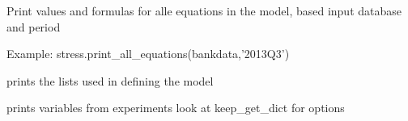\documentclass[letterpaper,10pt,english]{sphinxmanual}
\begin{document}
\begin{fulllineitems}
\begin{fulllineitems}
\end{fulllineitems}


\begin{fulllineitems}
\label{\detokenize{core/modelclass:modelclass.Display_Mixin.print_all_equations}}
\pysigstartsignatures
{}
\pysigstopsignatures
\sphinxAtStartPar
Print values and formulas for alle equations in the model, based input database and period

\sphinxAtStartPar
Example: stress.print\_all\_equations(bankdata,’2013Q3’)

\end{fulllineitems}


\begin{fulllineitems}
\label{\detokenize{core/modelclass:modelclass.Display_Mixin.print_lister}}
\pysigstartsignatures
{}
\pysigstopsignatures
\sphinxAtStartPar
prints the lists used in defining the model

\end{fulllineitems}


\begin{fulllineitems}
\label{\detokenize{core/modelclass:modelclass.Display_Mixin.keep_print}}
\pysigstartsignatures
{}
\pysigstopsignatures
\sphinxAtStartPar
prints variables from experiments look at keep\_get\_dict for options


\end{fulllineitems}
\end{fulllineitems}
\end{document}

